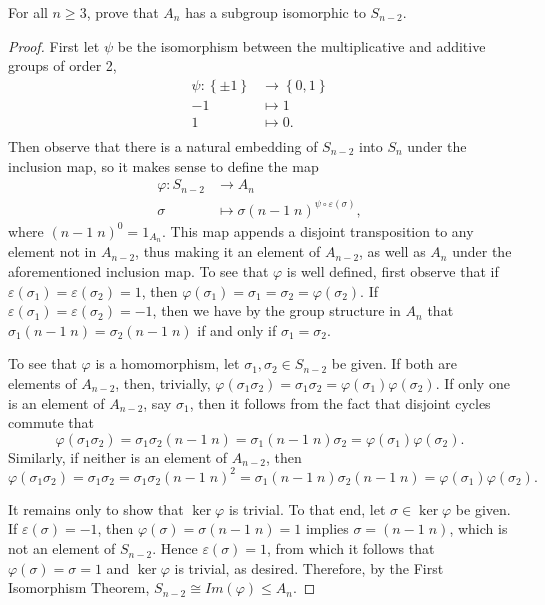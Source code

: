 \documentclass[10pt]{amsart}
\begin{document}
\begin{ex3}
  For all $n \geq 3$, prove that $A_n$ has a subgroup isomorphic to $S_{n-2}$.
  \begin{proof}
    First let $\psi$ be the isomorphism between the multiplicative and additive groups of order 2,
    \begin{align*}
      \psi \colon \left\{\pm 1\right\} & \rightarrow \left\{0,1\right\}\\
        -1 & \mapsto 1\\
        1 & \mapsto 0.\\
    \end{align*}
    Then observe that there is a natural embedding of $S_{n-2}$ into $S_n$ under the inclusion map, so it makes sense to define the map 
    \begin{align*}
      \varphi \colon S_{n-2} & \rightarrow A_n\\
      \sigma & \mapsto \sigma \left( n-1\; n \right)^{\psi\circ\varepsilon(\sigma)},
    \end{align*}
    where $(n-1\; n)^{0} = 1_{A_n}$.
    This map appends a disjoint transposition to any element not in $A_{n-2}$, thus making it an element of $A_{n-2}$, as well as $A_n$ under the aforementioned inclusion map.
    To see that $\varphi$ is well defined, first observe that if $\varepsilon(\sigma_1) = \varepsilon(\sigma_2) = 1$, then $\varphi(\sigma_1) = \sigma_1 = \sigma_2 = \varphi(\sigma_2)$.
    If $\varepsilon(\sigma_1) = \varepsilon(\sigma_2) = -1$, then  we have by the group structure in $A_n$ that $\sigma_1(n-1\; n) = \sigma_2(n-1\; n)$ if and only if $\sigma_1 = \sigma_2$.

    To see that $\varphi$ is a homomorphism, let $\sigma_1, \sigma_2 \in S_{n-2}$ be given.
    If both are elements of $A_{n-2}$, then, trivially, $\varphi(\sigma_1\sigma_2) = \sigma_1\sigma_2 = \varphi(\sigma_1)\varphi(\sigma_2)$.
    If only one is an element of $A_{n-2}$, say $\sigma_1$, then it follows from the fact that disjoint cycles commute that
    $$\varphi(\sigma_1\sigma_2) = \sigma_1\sigma_2(n-1\; n) = \sigma_1(n-1\; n)\sigma_2 = \varphi(\sigma_1)\varphi(\sigma_2).$$
    Similarly, if neither is an element of $A_{n-2}$, then
    $$\varphi(\sigma_1\sigma_2) = \sigma_1\sigma_2 = \sigma_1\sigma_2(n-1\; n)^2 = \sigma_1(n-1\; n)\sigma_2(n-1\; n) = \varphi(\sigma_1)\varphi(\sigma_2).$$
    
    It remains only to show that $\ker\varphi$ is trivial.  
    To that end, let $\sigma \in \ker\varphi$ be given.
    If $\varepsilon(\sigma) = -1$, then $\varphi(\sigma) = \sigma(n-1\; n) = 1$ implies $\sigma = (n-1\; n)$, which is not an element of $S_{n-2}$.
    Hence $\varepsilon(\sigma) = 1$, from which it follows that $\varphi(\sigma) = \sigma = 1$ and $\ker\varphi$ is trivial, as desired.
    Therefore, by the First Isomorphism Theorem, $S_{n-2} \cong Im(\varphi) \leq A_n$.
    
  \end{proof}
\end{ex3}
\end{document}
